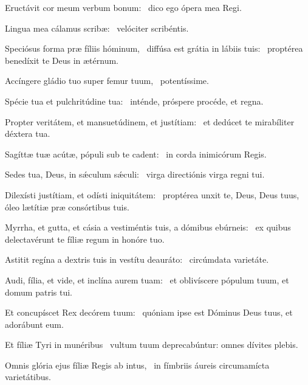 \item Eructávit cor meum verbum bonum:~\psstar{} dico ego ópera mea Regi.

\item Lingua mea cálamus scribæ:~\psstar{} velóciter scribéntis.

\item Speciósus forma præ fíliis hóminum,~\pscross{} diffúsa est grátia in lábiis tuis:~\psstar{} proptérea benedíxit te Deus in ætérnum.

\item Accíngere gládio tuo super femur tuum,~\psstar{} potentíssime.

\item Spécie tua et pulchritúdine tua:~\psstar{} inténde, próspere procéde, et regna.

\item Propter veritátem, et mansuetúdinem, et justítiam:~\psstar{} et dedúcet te mirabíliter déxtera tua.

\item Sagíttæ tuæ acútæ, pópuli sub te cadent:~\psstar{} in corda inimicórum Regis.

\item Sedes tua, Deus, in sǽculum sǽculi:~\psstar{} virga directiónis virga regni tui.

\item Dilexísti justítiam, et odísti iniquitátem:~\psstar{} proptérea unxit te, Deus, Deus tuus, óleo lætítiæ præ consórtibus tuis.

\item Myrrha, et gutta, et cásia a vestiméntis tuis, a dómibus ebúrneis:~\psstar{} ex quibus delectavérunt te fíliæ regum in honóre tuo.

\item Astitit regína a dextris tuis in vestítu deauráto:~\psstar{} circúmdata varietáte.

\item Audi, fília, et vide, et inclína aurem tuam:~\psstar{} et oblivíscere pópulum tuum, et domum patris tui.

\item Et concupíscet Rex decórem tuum:~\psstar{} quóniam ipse est Dóminus Deus tuus, et adorábunt eum.

\item Et fíliæ Tyri in munéribus~\psstar{} vultum tuum deprecabúntur: omnes dívites plebis.

\item Omnis glória ejus fíliæ Regis ab intus,~\psstar{} in fímbriis áureis circumamícta varietátibus.


